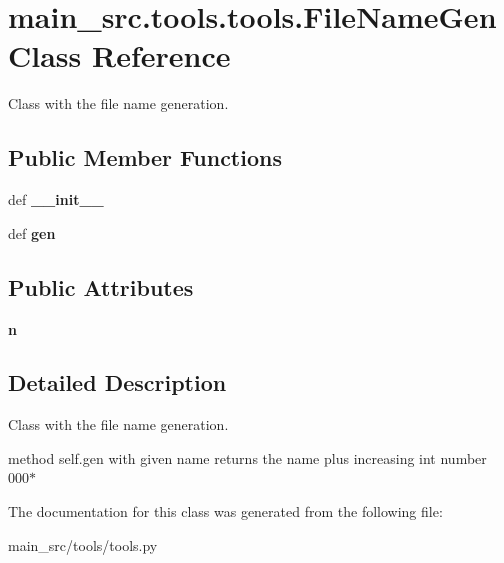 \hypertarget{classmain__src_1_1tools_1_1tools_1_1FileNameGen}{\section{main\-\_\-src.\-tools.\-tools.\-File\-Name\-Gen Class Reference}
\label{classmain__src_1_1tools_1_1tools_1_1FileNameGen}
}


Class with the file name generation.  


\subsection*{Public Member Functions}
\begin{DoxyCompactItemize}
\item 
\hypertarget{classmain__src_1_1tools_1_1tools_1_1FileNameGen_a59017467cb3edc6001d2d8ca7e9ff859}{def {\bfseries \-\_\-\-\_\-init\-\_\-\-\_\-}}\label{classmain__src_1_1tools_1_1tools_1_1FileNameGen_a59017467cb3edc6001d2d8ca7e9ff859}

\item 
\hypertarget{classmain__src_1_1tools_1_1tools_1_1FileNameGen_a3ec44991148db001359fe59a3aae70fb}{def {\bfseries gen}}\label{classmain__src_1_1tools_1_1tools_1_1FileNameGen_a3ec44991148db001359fe59a3aae70fb}

\end{DoxyCompactItemize}
\subsection*{Public Attributes}
\begin{DoxyCompactItemize}
\item 
\hypertarget{classmain__src_1_1tools_1_1tools_1_1FileNameGen_ae72bc32e9c84a8c57c54c0ecf7f38179}{{\bfseries n}}\label{classmain__src_1_1tools_1_1tools_1_1FileNameGen_ae72bc32e9c84a8c57c54c0ecf7f38179}

\end{DoxyCompactItemize}


\subsection{Detailed Description}
Class with the file name generation. 

method self.\-gen with given name returns the name plus increasing int number 000$\ast$ 

The documentation for this class was generated from the following file\-:\begin{DoxyCompactItemize}
\item 
main\-\_\-src/tools/tools.\-py\end{DoxyCompactItemize}
